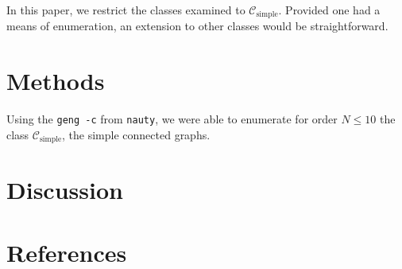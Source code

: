 \documentclass[12pt]{article}
\begin{document}
In this paper, we restrict the classes examined to $\mathcal{C}_\text{simple}$.
Provided one had a means of enumeration, an extension to other classes would be straightforward.

\section{Methods}
Using the \texttt{geng -c} from \texttt{nauty}, we were able to enumerate for order $N \le 10$ the class  $\mathcal{C}_\text{simple}$, the simple connected graphs.

\section{Discussion}
\section{References}
\end{document}
